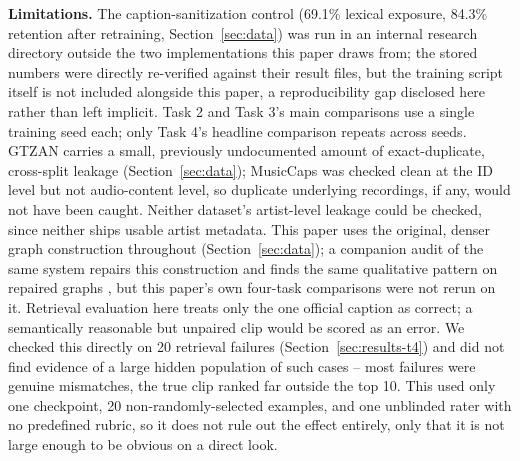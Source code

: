 \textbf{Limitations.} The caption-sanitization control (69.1\% lexical exposure, 84.3\%
retention after retraining, Section~\ref{sec:data}) was run in an internal research directory
outside the two implementations this paper draws from; the stored numbers were directly
re-verified against their result files, but the training script itself is not included
alongside this paper, a reproducibility gap disclosed here rather than left implicit. Task 2
and Task 3's main comparisons use a single training seed each; only Task 4's headline
comparison repeats across seeds. GTZAN carries a small, previously undocumented amount of
exact-duplicate, cross-split leakage (Section~\ref{sec:data}); MusicCaps was checked clean at
the ID level but not audio-content level, so duplicate underlying recordings, if any, would
not have been caught. Neither dataset's artist-level leakage could be checked, since neither
ships usable artist metadata. This paper uses the original, denser graph construction
throughout (Section~\ref{sec:data}); a companion audit of the same system repairs this
construction and finds the same qualitative pattern on repaired graphs \cite{tismir_audit},
but this paper's own four-task comparisons were not rerun on it. Retrieval evaluation here
treats only the one official caption as correct; a semantically reasonable but unpaired clip
would be scored as an error. We checked this directly on 20 retrieval failures
(Section~\ref{sec:results-t4}) and did not find evidence of a large hidden population of such
cases -- most failures were genuine mismatches, the true clip ranked far outside the top 10.
This used only one checkpoint, 20 non-randomly-selected examples, and one unblinded rater
with no predefined rubric, so it does not rule out the effect entirely, only that it is not
large enough to be obvious on a direct look.

